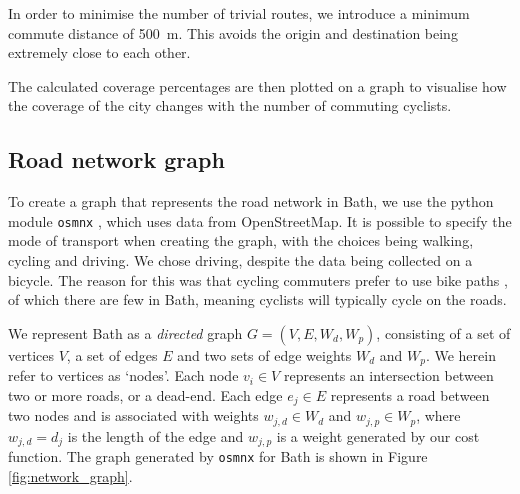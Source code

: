\documentclass[11pt]{report}
\begin{document}
In order to minimise the number of trivial routes, we introduce a minimum commute distance of 500~m. This avoids the origin and destination being extremely close to each other.

The calculated coverage percentages are then plotted on a graph to visualise how the coverage of the city changes with the number of commuting cyclists.


\subsection{Road network graph} \label{network_graph}

To create a graph that represents the road network in Bath, we use the python module \texttt{osmnx} \citep{boeing2017osmnx}, which uses data from OpenStreetMap. It is possible to specify the mode of transport when creating the graph, with the choices being walking, cycling and driving. We chose driving, despite the data being collected on a bicycle. The reason for this was that cycling commuters prefer to use bike paths \citep{skov_petersen2018cyclingpreferences, broach2012wherecyclistsride}, of which there are few in Bath, meaning cyclists will typically cycle on the roads.

We represent Bath as a \textit{directed} graph $G = (V, E, W_d, W_p)$, consisting of a set of vertices $V$, a set of edges $E$ and two sets of edge weights $W_d$ and $W_p$. We herein refer to vertices as `nodes'. Each node $v_i \in V$ represents an intersection between two or more roads, or a dead-end. Each edge $e_j \in E$ represents a road between two nodes and is associated with weights $w_{j, d} \in W_d$ and $w_{j, p} \in W_p$, where $w_{j, d} = d_j$ is the length of the edge and $w_{j, p}$ is a weight generated by our cost function. The graph generated by \texttt{osmnx} for Bath is shown in Figure \ref{fig:network_graph}.
\end{document}
